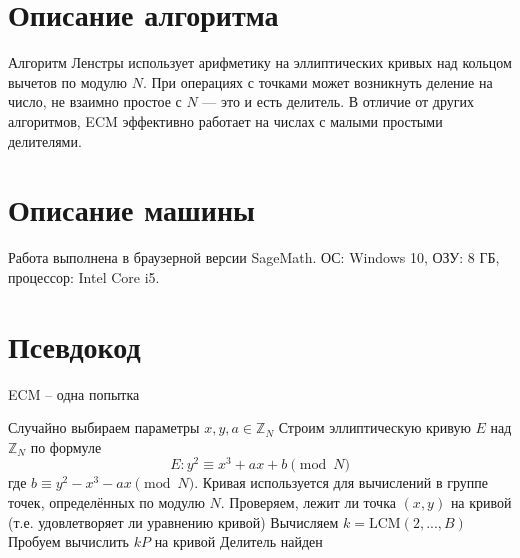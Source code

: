 \documentclass[12pt,a4paper]{article}
\begin{document}
\section*{Описание алгоритма}
Алгоритм Ленстры использует арифметику на эллиптических кривых над кольцом вычетов по модулю $N$. При операциях с точками может возникнуть деление на число, не взаимно простое с $N$ — это и есть делитель. В отличие от других алгоритмов, ECM эффективно работает на числах с малыми простыми делителями.

\section*{Описание машины}
Работа выполнена в браузерной версии SageMath. ОС: Windows 10, ОЗУ: 8 ГБ, процессор: Intel Core i5.

\section*{Псевдокод}
\begin{algorithm}[H]
\caption{ECM – одна попытка}
\begin{algorithmic}[1]
\State Случайно выбираем параметры $x, y, a \in \mathbb{Z}_N$
\State Строим эллиптическую кривую $E$ над $\mathbb{Z}_N$ по формуле 
\[
    E: y^2 \equiv x^3 + ax + b \pmod{N}
\]
где $b \equiv y^2 - x^3 - a x \pmod{N}$. Кривая используется для вычислений в группе точек, определённых по модулю $N$.
\State Проверяем, лежит ли точка $(x, y)$ на кривой (т.е. удовлетворяет ли уравнению кривой)
\State Вычисляем $k = \text{LCM}(2, ..., B)$
\State Пробуем вычислить $kP$ на кривой
  \State Делитель найден
\end{algorithmic}
\end{algorithm}
\end{document}
